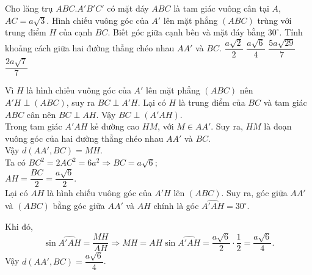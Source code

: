 \begin{ex}%
 Cho lăng trụ $ABC.A'B'C'$ có mặt đáy $ABC$ là tam giác vuông cân tại $A$, $AC=a\sqrt{3}$. Hình chiếu vuông góc của $A'$ lên mặt phẳng $(ABC)$ trùng với trung điểm $H$ của cạnh $BC$. Biết góc giữa cạnh bên và mặt đáy bằng $30^\circ$. Tính khoảng cách giữa hai đường thẳng chéo nhau $AA'$ và $BC$.
 \choice
  {$\dfrac{a\sqrt{2}}{2}$}
  {\True $\dfrac{a\sqrt{6}}{4}$}
  {$\dfrac{5a\sqrt{29}}{7}$}
  {$\dfrac{2a\sqrt{7}}{7}$}
 \loigiai
  {
  \immini
  {
  Vì $H$ là hình chiếu vuông góc của $A'$ lên mặt phẳng $(ABC)$ nên $A'H \perp (ABC)$, suy ra $BC \perp A'H$. Lại có $H$ là trung điểm của $BC$ và tam giác $ABC$ cân nên $BC \perp AH$. Vậy $BC \perp (A'AH)$.\\
  Trong tam giác $A'AH$ kẻ đường cao $HM$, với $M \in AA'$. Suy ra, $HM$ là đoạn vuông góc của hai đường thẳng chéo nhau $AA'$ và $BC$.\\
  Vậy $d(AA',BC) = MH$.\\
  Ta có $BC^2 = 2AC^2 = 6a^2 \Rightarrow BC = a\sqrt{6}$;\\
  $AH = \dfrac{BC}{2} = \dfrac{a\sqrt{6}}{2}$.\\
  Lại có $AH$ là hình chiếu vuông góc của $A'H$ lên $(ABC)$. Suy ra, góc giữa $AA'$ và $(ABC)$ bằng góc giữa $AA'$ và $AH$ chính là góc $\widehat{A'AH} = 30^\circ$.
  }
  {
  }
  \noindent
  Khi đó, $$\sin \widehat{A'AH} = \dfrac{MH}{AH} \Rightarrow MH = AH \sin \widehat{A'AH} = \dfrac{a\sqrt{6}}{2} \cdot \dfrac{1}{2} = \dfrac{a\sqrt{6}}{4}.$$
  Vậy $d(AA',BC) = \dfrac{a\sqrt{6}}{4}$.
  }
\end{ex}


